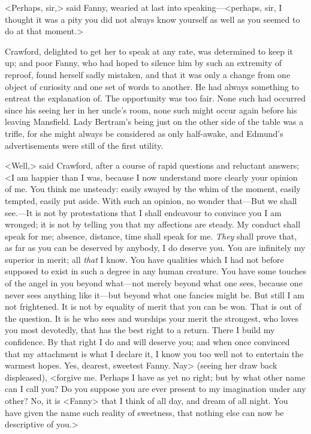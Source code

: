 <Perhaps, sir,> said Fanny, wearied at last into speaking—<perhaps, sir, I thought it was a pity you did not always know yourself as well as you seemed to do at that moment.>

Crawford, delighted to get her to speak at any rate, was determined to keep it up; and poor Fanny, who had hoped to silence him by such an extremity of reproof, found herself sadly mistaken, and that it was only a change from one object of curiosity and one set of words to another. He had always something to entreat the explanation of. The opportunity was too fair. None such had occurred since his seeing her in her uncle's room, none such might occur again before his leaving Mansfield. Lady Bertram's being just on the other side of the table was a trifle, for she might always be considered as only half-awake, and Edmund's advertisements were still of the first utility.

<Well,> said Crawford, after a course of rapid questions and reluctant answers; <I am happier than I was, because I now understand more clearly your opinion of me. You think me unsteady: easily swayed by the whim of the moment, easily tempted, easily put aside. With such an opinion, no wonder that—But we shall see.—It is not by protestations that I shall endeavour to convince you I am wronged; it is not by telling you that my affections are steady. My conduct shall speak for me; absence, distance, time shall speak for me. \textit{They}  shall prove that, as far as you can be deserved by anybody, I do deserve you. You are infinitely my superior in merit; all \textit{that}  I know. You have qualities which I had not before supposed to exist in such a degree in any human creature. You have some touches of the angel in you beyond what—not merely beyond what one sees, because one never sees anything like it—but beyond what one fancies might be. But still I am not frightened. It is not by equality of merit that you can be won. That is out of the question. It is he who sees and worships your merit the strongest, who loves you most devotedly, that has the best right to a return. There I build my confidence. By that right I do and will deserve you; and when once convinced that my attachment is what I declare it, I know you too well not to entertain the warmest hopes. Yes, dearest, sweetest Fanny. Nay> (seeing her draw back displeased), <forgive me. Perhaps I have as yet no right; but by what other name can I call you? Do you suppose you are ever present to my imagination under any other? No, it is <Fanny> that I think of all day, and dream of all night. You have given the name such reality of sweetness, that nothing else can now be descriptive of you.>

